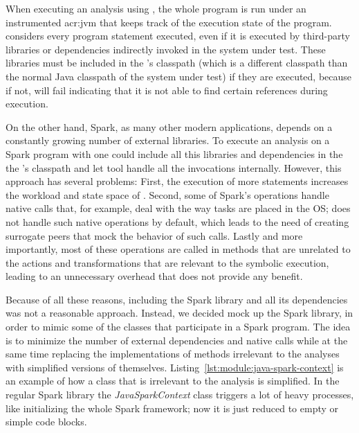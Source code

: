 
When executing an analysis using \jpf, the whole program is run under an instrumented \acrshort{acr:jvm} that keeps track of the execution state of the program. \jpf considers every program statement executed, even if it is executed by third-party libraries or dependencies indirectly invoked in the system under test. These libraries must be included in the \jpf's classpath (which is a different classpath than the normal Java classpath of the system under test) if they are executed, because if not, \jpf will fail indicating that it is not able to find certain references during execution.

On the other hand, Spark, as many other modern applications, depends on a constantly growing number of external libraries. To execute an analysis on a Spark program with \jpf one could include all this libraries and dependencies in the the \jpf's classpath and let tool handle all the invocations internally. However, this approach has several problems: First, the execution of more statements increases the workload and state space of \jpf. Second, some of Spark's operations handle native calls that, for example, deal with the way tasks are placed in the OS; \jpf does not handle such native operations by default, which leads to the need of creating surrogate peers that mock the behavior of such calls. Lastly and more importantly, most of these operations are called in methods that are unrelated to the actions and transformations that are relevant to the symbolic execution, leading to an unnecessary overhead that does not provide any benefit.

Because of all these reasons, including the Spark library and all its dependencies was not a reasonable approach. Instead, we decided mock up the Spark library, in order to mimic some of the classes that participate in a Spark program. The idea is to minimize the number of external dependencies and native calls while at the same time replacing the implementations of methods irrelevant to the analyses with simplified versions of themselves. Listing~\ref{lst:module:java-spark-context} is an example of how a class that is irrelevant to the analysis is simplified. In the regular Spark library the \textit{JavaSparkContext} class triggers a lot of heavy processes, like initializing the whole Spark framework; now it is just reduced to empty or simple code blocks.

